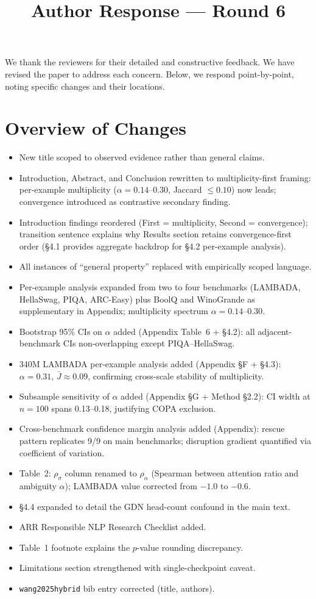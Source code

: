 \documentclass[11pt]{article}
\title{Author Response --- Round 6}
\author{}
\date{}
\begin{document}
\maketitle

We thank the reviewers for their detailed and constructive feedback. We have revised the paper to address each concern. Below, we respond point-by-point, noting specific changes and their locations.

\section*{Overview of Changes}

\begin{itemize}[leftmargin=*]
\item New title scoped to observed evidence rather than general claims.
\item Introduction, Abstract, and Conclusion rewritten to multiplicity-first framing: per-example multiplicity ($\alpha = 0.14$--$0.30$, Jaccard $\leq 0.10$) now leads; convergence introduced as contrastive secondary finding.
\item Introduction findings reordered (First = multiplicity, Second = convergence); transition sentence explains why Results section retains convergence-first order (\S4.1 provides aggregate backdrop for \S4.2 per-example analysis).
\item All instances of ``general property'' replaced with empirically scoped language.
\item Per-example analysis expanded from two to four benchmarks (LAMBADA, HellaSwag, PIQA, ARC-Easy) plus BoolQ and WinoGrande as supplementary in Appendix; multiplicity spectrum $\alpha = 0.14$--$0.30$.
\item Bootstrap 95\% CIs on $\alpha$ added (Appendix Table~6 + \S4.2): all adjacent-benchmark CIs non-overlapping except PIQA--HellaSwag.
\item 340M LAMBADA per-example analysis added (Appendix \S F + \S4.3): $\alpha = 0.31$, $\bar{J} \approx 0.09$, confirming cross-scale stability of multiplicity.
\item Subsample sensitivity of $\alpha$ added (Appendix \S G + Method \S2.2): CI width at $n = 100$ spans 0.13--0.18, justifying COPA exclusion.
\item Cross-benchmark confidence margin analysis added (Appendix): rescue pattern replicates 9/9 on main benchmarks; disruption gradient quantified via coefficient of variation.
\item Table~2: $\rho_\sigma$ column renamed to $\rho_\alpha$ (Spearman between attention ratio and ambiguity $\alpha$); LAMBADA value corrected from $-1.0$ to $-0.6$.
\item \S4.4 expanded to detail the GDN head-count confound in the main text.
\item ARR Responsible NLP Research Checklist added.
\item Table~1 footnote explains the $p$-value rounding discrepancy.
\item Limitations section strengthened with single-checkpoint caveat.
\item \texttt{wang2025hybrid} bib entry corrected (title, authors).
\end{itemize}
\end{document}
